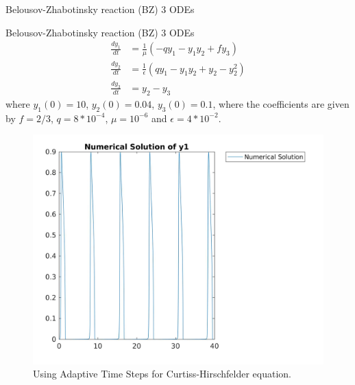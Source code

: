 \documentclass[9pt]{beamer}
\numberwithin{equation}{section}
\begin{document}
\begin{frame}{Belousov-Zhabotinsky reaction (BZ) 3 ODEs}
\begin{block}{Belousov-Zhabotinsky reaction (BZ) 3 ODEs}
\begin{subequations}
\begin{align}
    \frac{dy_1}{dt}  &=  \frac{1}{\mu} (-qy_1 -y_1y_2 + fy_3)
    \\
    \frac{dy_2}{dt}  &=  \frac{1}{\epsilon} (qy_1 -y_1y_2 + y_2 - y_2^2)
    \\
    \frac{dy_3}{dt}  &=  y_2-y_3
\end{align}
\end{subequations}
where $y_1(0) = 10$, $y_2(0) = 0.04$, $y_3(0) = 0.1$,
where the coefficients are given by $f = 2/3$, $q = 8*10^{-4}$, $\mu=10^{-6}$ and $\epsilon = 4*10^{-2}$.
%
\end{block}
\end{frame}

\begin{frame}
\begin{figure}
\centering
\includegraphics[scale=0.15]{ats_o3_y1}
\caption{Using Adaptive Time Steps for Curtiss-Hirschfelder equation.}
\end{figure}
\end{frame}
\end{document}
